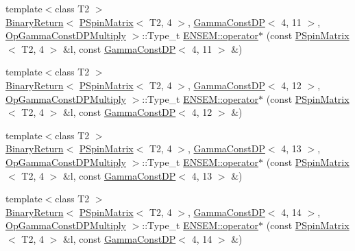 \begin{DoxyCompactItemize}
\item 
{\footnotesize template$<$class T2 $>$ }\\\mbox{\hyperlink{structENSEM_1_1BinaryReturn}{Binary\+Return}}$<$ \mbox{\hyperlink{classENSEM_1_1PSpinMatrix}{P\+Spin\+Matrix}}$<$ T2, 4 $>$, \mbox{\hyperlink{classENSEM_1_1GammaConstDP}{Gamma\+Const\+DP}}$<$ 4, 11 $>$, \mbox{\hyperlink{structENSEM_1_1OpGammaConstDPMultiply}{Op\+Gamma\+Const\+D\+P\+Multiply}} $>$\+::Type\+\_\+t \mbox{\hyperlink{group__primspinmatrix_gafdfa5cea94c5b8301c476e73bf94071c}{E\+N\+S\+E\+M\+::operator$\ast$}} (const \mbox{\hyperlink{classENSEM_1_1PSpinMatrix}{P\+Spin\+Matrix}}$<$ T2, 4 $>$ \&l, const \mbox{\hyperlink{classENSEM_1_1GammaConstDP}{Gamma\+Const\+DP}}$<$ 4, 11 $>$ \&)
\item 
{\footnotesize template$<$class T2 $>$ }\\\mbox{\hyperlink{structENSEM_1_1BinaryReturn}{Binary\+Return}}$<$ \mbox{\hyperlink{classENSEM_1_1PSpinMatrix}{P\+Spin\+Matrix}}$<$ T2, 4 $>$, \mbox{\hyperlink{classENSEM_1_1GammaConstDP}{Gamma\+Const\+DP}}$<$ 4, 12 $>$, \mbox{\hyperlink{structENSEM_1_1OpGammaConstDPMultiply}{Op\+Gamma\+Const\+D\+P\+Multiply}} $>$\+::Type\+\_\+t \mbox{\hyperlink{group__primspinmatrix_ga554a403dc2f232b906a5f7a9971eced3}{E\+N\+S\+E\+M\+::operator$\ast$}} (const \mbox{\hyperlink{classENSEM_1_1PSpinMatrix}{P\+Spin\+Matrix}}$<$ T2, 4 $>$ \&l, const \mbox{\hyperlink{classENSEM_1_1GammaConstDP}{Gamma\+Const\+DP}}$<$ 4, 12 $>$ \&)
\item 
{\footnotesize template$<$class T2 $>$ }\\\mbox{\hyperlink{structENSEM_1_1BinaryReturn}{Binary\+Return}}$<$ \mbox{\hyperlink{classENSEM_1_1PSpinMatrix}{P\+Spin\+Matrix}}$<$ T2, 4 $>$, \mbox{\hyperlink{classENSEM_1_1GammaConstDP}{Gamma\+Const\+DP}}$<$ 4, 13 $>$, \mbox{\hyperlink{structENSEM_1_1OpGammaConstDPMultiply}{Op\+Gamma\+Const\+D\+P\+Multiply}} $>$\+::Type\+\_\+t \mbox{\hyperlink{group__primspinmatrix_ga1b7bc726f48b4c37350818e1d825d16d}{E\+N\+S\+E\+M\+::operator$\ast$}} (const \mbox{\hyperlink{classENSEM_1_1PSpinMatrix}{P\+Spin\+Matrix}}$<$ T2, 4 $>$ \&l, const \mbox{\hyperlink{classENSEM_1_1GammaConstDP}{Gamma\+Const\+DP}}$<$ 4, 13 $>$ \&)
\item 
{\footnotesize template$<$class T2 $>$ }\\\mbox{\hyperlink{structENSEM_1_1BinaryReturn}{Binary\+Return}}$<$ \mbox{\hyperlink{classENSEM_1_1PSpinMatrix}{P\+Spin\+Matrix}}$<$ T2, 4 $>$, \mbox{\hyperlink{classENSEM_1_1GammaConstDP}{Gamma\+Const\+DP}}$<$ 4, 14 $>$, \mbox{\hyperlink{structENSEM_1_1OpGammaConstDPMultiply}{Op\+Gamma\+Const\+D\+P\+Multiply}} $>$\+::Type\+\_\+t \mbox{\hyperlink{group__primspinmatrix_ga701841ed0546a547ae068731f72d9054}{E\+N\+S\+E\+M\+::operator$\ast$}} (const \mbox{\hyperlink{classENSEM_1_1PSpinMatrix}{P\+Spin\+Matrix}}$<$ T2, 4 $>$ \&l, const \mbox{\hyperlink{classENSEM_1_1GammaConstDP}{Gamma\+Const\+DP}}$<$ 4, 14 $>$ \&)

\end{DoxyCompactItemize}
